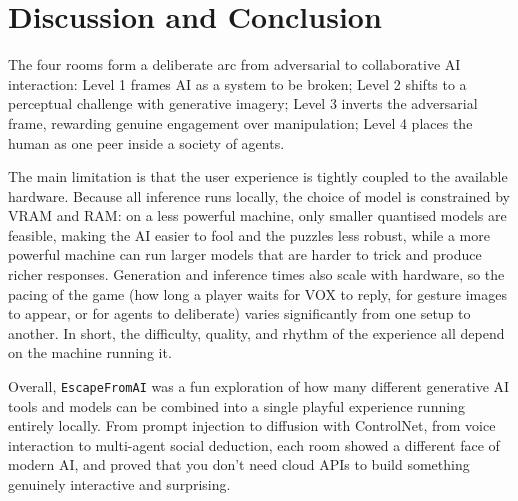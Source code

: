 \documentclass[11pt,a4paper]{article}
\begin{document}
\section{Discussion and Conclusion}

The four rooms form a deliberate arc from adversarial to collaborative AI interaction:
Level 1 frames AI as a system to be broken; Level 2 shifts to a perceptual challenge
with generative imagery; Level 3 inverts the adversarial frame, rewarding genuine
engagement over manipulation; Level 4 places the human as one peer inside a society
of agents.

The main limitation is that the user experience is tightly coupled to the available
hardware. Because all inference runs locally, the choice of model is constrained by
VRAM and RAM: on a less powerful machine, only smaller quantised models are feasible,
making the AI easier to fool and the puzzles less robust, while a more powerful machine
can run larger models that are harder to trick and produce richer responses. Generation
and inference times also scale with hardware, so the pacing of the game (how long a
player waits for VOX to reply, for gesture images to appear, or for agents to deliberate)
varies significantly from one setup to another. In short, the difficulty, quality,
and rhythm of the experience all depend on the machine running it.

Overall, \texttt{EscapeFromAI} was a fun exploration of how many different generative
AI tools and models can be combined into a single playful experience running entirely
locally. From prompt injection to diffusion with ControlNet, from voice interaction to
multi-agent social deduction, each room showed a different face of modern AI, and
proved that you don't need cloud APIs to build something genuinely interactive and
surprising.
\end{document}
